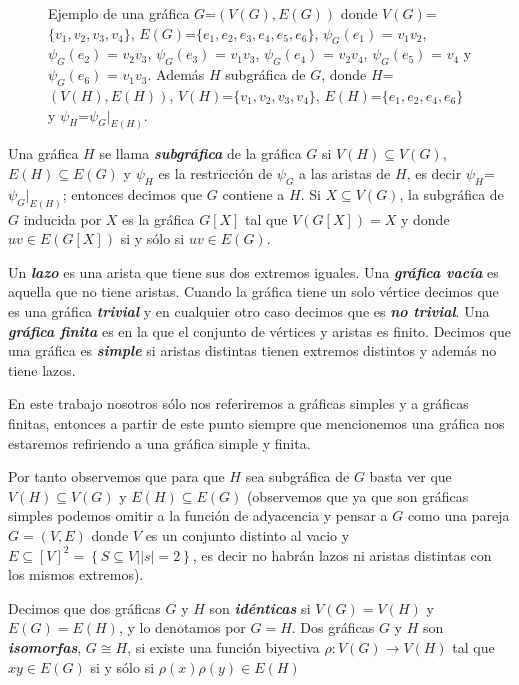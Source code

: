 \begin{figure}[ht]
\begin{center}
\begin{tikzpicture}
        \end{tikzpicture}
    \end{center}\caption{Ejemplo de una gr\'afica $G$=$(V(G),E(G))$ donde $V(G)$=$\{v_1,v_2,v_3,v_4\}$, $E(G)
    $=$\{e_1,e_2,e_3,e_4,e_5,e_6\}$, $\psi_G(e_1)$ = $v_1v_2$, $\psi_G(e_2)$ = $v_2v_3$, $\psi_G(e_3)$ = $v_1v_3$,
        $\psi_G(e_4)$ = $v_2v_4$, $\psi_G(e_5)$ = $v_4$ y $\psi_G(e_6)$ = $v_1v_3$. Adem\'as $H$ subgr\'afica de $G$,
        donde $H$=$(V(H), E(H))$, $V(H)$=$\{v_1, v_2, v_3, v_4\}$, $E(H)$=$\{e_1, e_2, e_4, e_6\}$ y
        $\psi_H$=$\psi_G\big|_{E(H)}$.}
\end{figure}


Una gr\'afica $H$ se llama \textbf{\textit{subgr\'afica}} de la gr\'afica $G$ si $V(H) \subseteq V(G)$, $E(H)
\subseteq E(G)$ y $\psi_H$ es la restricci\'on de $\psi_G$ a las aristas de $H$, es decir $\psi_H$=$\psi_G$$\big|_{E
(H)}$; entonces decimos que $G$ contiene a $H$. Si $X \subseteq V(G)$, la subgr\' afica de $G$ inducida por $X$ es la
gr\' afica $G[X]$ tal que $V(G[X]) = X$ y donde $uv \in E(G[X])$ si y s\'olo si $uv \in E(G)$.

Un\textbf{\textit{ lazo}} es una arista que tiene sus dos extremos iguales.
Una \textbf{\textit{gr\'afica vac\'ia}} es aquella que no tiene aristas.
Cuando la gr\'afica tiene un solo v\'ertice decimos que es una gr\'afica \textbf{\textit{trivial}} y en cualquier
otro caso decimos que es \textbf{\textit{no trivial}}.
Una \textbf{\textit{gr\'afica finita}} es en la que el conjunto de v\'ertices y aristas es finito.
Decimos que una gr\'afica es \textbf{\textit{simple}} si aristas distintas tienen extremos distintos y adem\'as no
tiene lazos.


En este trabajo nosotros s\'olo nos referiremos a gr\'aficas simples y a gr\'aficas finitas, entonces a partir de
este punto siempre que mencionemos una gr\'afica nos estaremos refiriendo a una gr\'afica simple y finita.

Por tanto observemos que para que $H$ sea subgr\'afica de $G$ basta ver que $V(H) \subseteq V(G)$ y $E(H) \subseteq E
(G)$ (observemos que ya que son gr\'aficas simples podemos omitir a la funci\'on de adyacencia y pensar a $G$ como
una pareja $G=(V,E)$ donde $V$ es un conjunto distinto al vacio y $E \subseteq  [V]^2 = \left\{ S\subseteq V\big| |s|
=2\right\}$, es decir no habr\'an lazos ni aristas distintas con los mismos extremos).

Decimos que dos gr\'aficas $G$ y $H$ son \textbf{\textit{id\'enticas}} si $V(G) =V(H)$ y $E(G)=E(H)$, y lo denotamos
por $G = H$.
Dos gr\'aficas $G$ y $H$ son \textbf{\textit{isomorfas}}, $G\cong H$, si existe una funci\'on biyectiva $\rho : V(G)
\to V(H)$  tal que $xy \in E(G)$ si y s\'olo si $\rho(x)\rho(y) \in E(H)$

